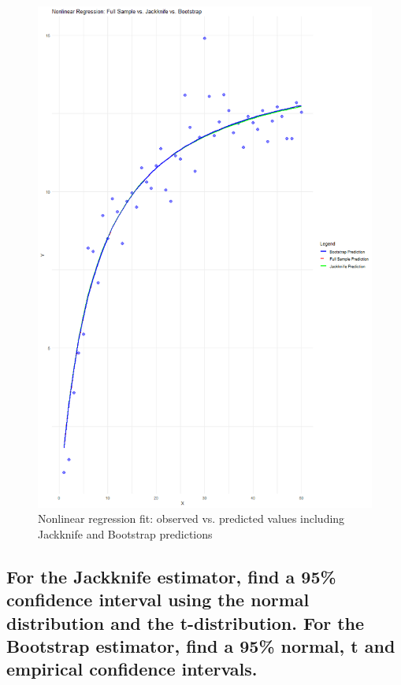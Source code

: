 \documentclass[]{article}
\begin{document}
\begin{figure}[H]
	\centering
	\includegraphics[width=0.7\linewidth]{img/img-4-1-2}
	\caption{Nonlinear regression fit: observed vs. predicted values including Jackknife and Bootstrap predictions}
	\label{fig:img-4-1-2}
\end{figure}

\subsection{For the Jackknife estimator, find a 95\% confidence interval using the normal distribution and the t-distribution. For the Bootstrap estimator, find a 95\% normal, t and empirical confidence intervals.}
\end{document}

